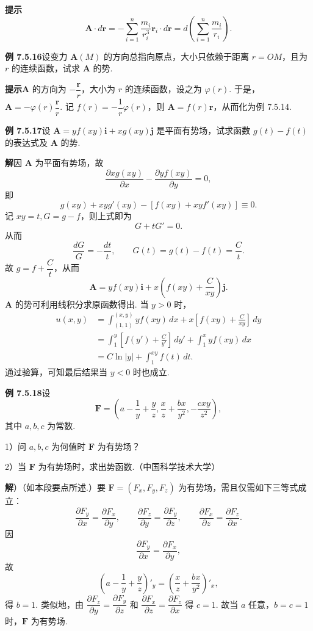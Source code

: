 \documentclass[UTF8,12pt,a4paper,fontset=fandol]{ctexart}
\begin{document}
\noindent\textbf{提示}\quad
\[
\mathbf A\cdot d\mathbf r=-\sum_{i=1}^n\frac{m_i}{r_i^3}\mathbf r_i\cdot d\mathbf r
=d\left(\sum_{i=1}^n\frac{m_i}{r_i}\right).
\]

\noindent\textbf{例 7.5.16}\quad 设变力 $\mathbf A(M)$ 的方向总指向原点，大小只依赖于距离 $r=OM$，且为 $r$ 的连续函数，试求 $\mathbf A$ 的势.

\noindent\textbf{提示}\quad $\mathbf A$ 的方向为 $-\dfrac{\mathbf r}{r}$，大小为 $r$ 的连续函数，设之为 $\varphi(r)$. 于是，$\mathbf A=-\varphi(r)\dfrac{\mathbf r}{r}$.
记 $f(r)=-\dfrac1r\varphi(r)$，则 $\mathbf A=f(r)\mathbf r$，从而化为例 7.5.14.

\noindent\textbf{例 7.5.17}\quad 设 $\mathbf A=yf(xy)\mathbf i+xg(xy)\mathbf j$ 是平面有势场，试求函数 $g(t)-f(t)$ 的表达式及 $\mathbf A$ 的势.

\noindent\textbf{解}\quad 因 $\mathbf A$ 为平面有势场，故
\[
\frac{\partial xg(xy)}{\partial x}-\frac{\partial yf(xy)}{\partial y}=0,
\]
即
\[
g(xy)+xyg'(xy)-[f(xy)+xyf'(xy)]\equiv0.
\]
记 $xy=t,G=g-f$，则上式即为
\[
G+tG'=0.
\]
从而
\[
\frac{dG}{G}=-\frac{dt}{t},\qquad G(t)=g(t)-f(t)=\frac Ct.
\]
故 $g=f+\dfrac Ct$，从而
\[
\mathbf A=yf(xy)\mathbf i+x\left(f(xy)+\frac C{xy}\right)\mathbf j.
\]
$\mathbf A$ 的势可利用线积分求原函数得出. 当 $y>0$ 时，
\[
\begin{aligned}
u(x,y)
&=\int_{(1,1)}^{(x,y)}yf(xy)\,dx+x\left[f(xy)+\frac C{xy}\right]\,dy\\
&=\int_1^y\left[f(y')+\frac C{y'}\right]\,dy'
+\int_1^x yf(xy)\,dx\\
&=C\ln|y|+\int_1^{xy}f(t)\,dt.
\end{aligned}
\]
通过验算，可知最后结果当 $y<0$ 时也成立.

\noindent\textbf{例 7.5.18}\quad 设
\[
\mathbf F=\left(a-\frac1y+\frac yz,\frac xz+\frac{bx}{y^2},-\frac{cxy}{z^2}\right),
\]
其中 $a,b,c$ 为常数.

1）问 $a,b,c$ 为何值时 $\mathbf F$ 为有势场？

2）当 $\mathbf F$ 为有势场时，求出势函数.（中国科学技术大学）

\noindent\textbf{解}）（如本段要点所述.）要 $\mathbf F=(F_x,F_y,F_z)$ 为有势场，需且仅需如下三等式成立：
\[
\frac{\partial F_y}{\partial x}=\frac{\partial F_x}{\partial y},\qquad
\frac{\partial F_z}{\partial y}=\frac{\partial F_y}{\partial z},\qquad
\frac{\partial F_x}{\partial z}=\frac{\partial F_z}{\partial x}.
\]
因
\[
\frac{\partial F_y}{\partial x}=\frac{\partial F_x}{\partial y},
\]
故
\[
\left(a-\frac1y+\frac yz\right)'_y=\left(\frac xz+\frac{bx}{y^2}\right)'_x,
\]
得 $b=1$.
类似地，由 $\dfrac{\partial F_z}{\partial y}=\dfrac{\partial F_y}{\partial z}$ 和 $\dfrac{\partial F_x}{\partial z}=\dfrac{\partial F_z}{\partial x}$ 得 $c=1$. 故当 $a$ 任意，$b=c=1$ 时，$\mathbf F$ 为有势场.
\end{document}

